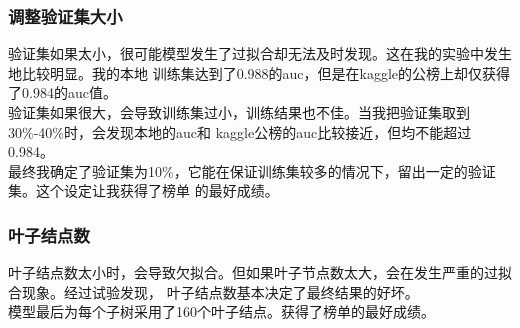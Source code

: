 \documentclass[a4paper]{article}
\begin{document}
\subsubsection{调整验证集大小}
验证集如果太小，很可能模型发生了过拟合却无法及时发现。这在我的实验中发生地比较明显。我的本地
训练集达到了0.988的auc，但是在kaggle的公榜上却仅获得了0.984的auc值。\\

验证集如果很大，会导致训练集过小，训练结果也不佳。当我把验证集取到30\%-40\%时，会发现本地的auc和
kaggle公榜的auc比较接近，但均不能超过0.984。\\

最终我确定了验证集为10\%，它能在保证训练集较多的情况下，留出一定的验证集。这个设定让我获得了榜单
的最好成绩。
\subsubsection{叶子结点数}
叶子结点数太小时，会导致欠拟合。但如果叶子节点数太大，会在发生严重的过拟合现象。经过试验发现，
叶子结点数基本决定了最终结果的好坏。\\

模型最后为每个子树采用了160个叶子结点。获得了榜单的最好成绩。

\end{document}
